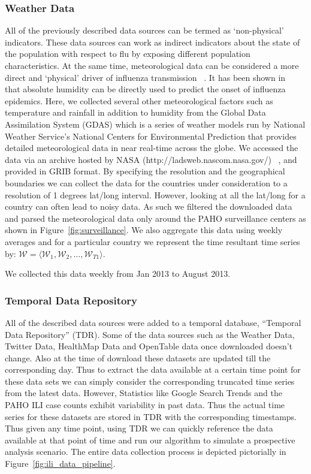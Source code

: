 \subsubsection{Weather Data}
All of the previously described data sources can
be termed as `non-physical' indicators. These data sources can work as indirect
indicators about the state of the population with respect to flu by exposing
different population characteristics. At the same time, meteorological data can
be considered a more direct and `physical' driver of influenza transmission
~\cite{flu_humidity_physical}. It has been shown
in~\cite{Shaman_orig_humidity_link, Shaman_humidity_USA, ref9}
that absolute humidity can be directly used to predict the onset of influenza
epidemics. Here, we collected several other meteorological factors such as
temperature and rainfall in addition to humidity from the Global Data
Assimilation System (GDAS) which is a series of weather models run by National
Weather Service's National Centers for Environmental Prediction that provides
detailed meteorological data in near real-time across the globe.  We accessed
the data via an archive hosted by NASA (http://ladsweb.nascom.nasa.gov/)
~\cite{HD:2013}, and provided in GRIB format. By specifying the resolution and
the geographical boundaries we can collect the data for the countries under
consideration to a resolution of 1 degrees lat/long interval. However, looking
at all the lat/long for a country can often lead to noisy data. As such we
filtered the downloaded data and parsed the meteorological data only around the
PAHO surveillance centers as shown in Figure~\ref{fig:surveillance}. We also
aggregate this data using weekly averages and for a particular country we
represent the time resultant time series by: 
$\mathcal{W} = \langle \mathcal{W}_1, \mathcal{W}_2, \dots, \mathcal{W}_{T1} \rangle$.

We collected this data weekly from Jan 2013 to August 2013. 


\subsubsection{Temporal Data Repository}
All of the described data sources were
added to a temporal database, ``Temporal Data Repository'' (TDR). Some of the
data sources such as the Weather Data, Twitter Data, HealthMap Data and
OpenTable data once downloaded doesn't change. Also at the time of download
these datasets are updated till the corresponding day.  Thus to extract the
data available at a certain time point for these data sets we can simply
consider the corresponding truncated time series from the latest data. However,
Statistics like Google Search Trends and the PAHO ILI case counts exhibit
variability in past data. Thus the actual time series for these datasets are
stored in TDR with the corresponding timestamps. Thus given any time point,
using TDR we can quickly reference the data available at that point of time and
run our algorithm to simulate a prospective analysis scenario.  The entire data
collection process is depicted pictorially in
Figure~\ref{fig:ili_data_pipeline}.



